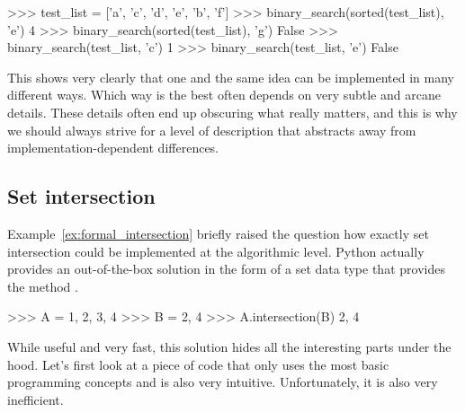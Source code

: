 \begin{programming}
\begin{center}
\end{center}
\begin{center}
    \begin{pythoncode}
    >>> test_list = ['a', 'c', 'd', 'e', 'b', 'f']
    >>> binary_search(sorted(test_list), 'e')
    4
    >>> binary_search(sorted(test_list), 'g')
    False
    >>> binary_search(test_list, 'c')
    1
    >>> binary_search(test_list, 'e')
    False
    \end{pythoncode}
\end{center}

This shows very clearly that one and the same idea can be implemented in many different ways.
Which way is the best often depends on very subtle and arcane details. 
These details often end up obscuring what really matters, and this is why we should always strive for a level of description that abstracts away from implementation-dependent differences.



\subsection{Set intersection}
\label{ssec:formal_code_setintersection}

Example~\ref{ex:formal_intersection} briefly raised the question how exactly set intersection could be implemented at the algorithmic level.
Python actually provides an out-of-the-box solution in the form of a set data type that provides the method .

\begin{center}
    \begin{pythoncode}
    >>> A = {1, 2, 3, 4}
    >>> B = {2, 4}
    >>> A.intersection(B)
    {2, 4}
    \end{pythoncode}
\end{center}

While useful and very fast, this solution hides all the interesting parts under the hood.
Let's first look at a piece of code that only uses the most basic programming concepts and is also very intuitive.
Unfortunately, it is also very inefficient.

\begin{center}
\end{center}


\end{programming}
